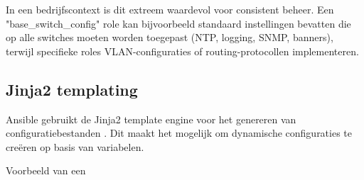 In een bedrijfscontext is dit extreem waardevol voor consistent beheer. 
Een "base\_switch\_config" role kan bijvoorbeeld standaard instellingen bevatten die op alle switches moeten worden toegepast (NTP, logging, SNMP, banners), terwijl specifieke roles VLAN-configuraties of routing-protocollen implementeren.

\subsection{Jinja2 templating}
\label{subsec:jinja2-templating}

Ansible gebruikt de Jinja2 template engine voor het genereren van configuratiebestanden \autocite{RedHat2024AnsibleDocs}. 
Dit maakt het mogelijk om dynamische configuraties te creëren op basis van variabelen.

Voorbeeld van een